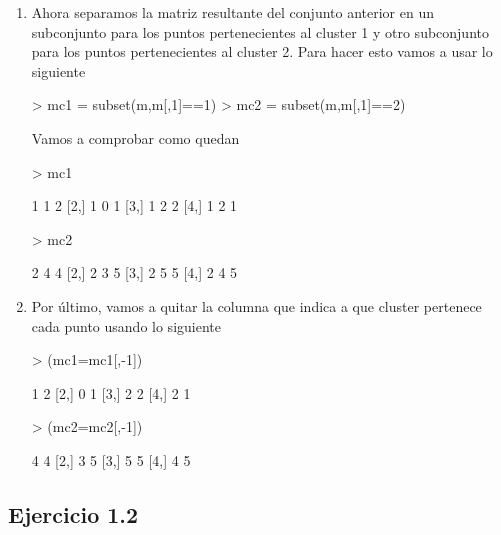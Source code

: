 \documentclass[parskip=full]{scrartcl}
\begin{document}
\begin{enumerate}
    \item Ahora separamos la matriz resultante del conjunto anterior en un subconjunto para los puntos pertenecientes al cluster 1 y otro subconjunto para los puntos pertenecientes al cluster 2. Para hacer esto vamos a usar lo siguiente


\begin{Schunk}
\begin{Sinput}
> mc1 = subset(m,m[,1]==1)
> mc2 = subset(m,m[,1]==2)
\end{Sinput}
\end{Schunk}


    Vamos a comprobar como quedan


\begin{Schunk}
\begin{Sinput}
> mc1
\end{Sinput}
\begin{Soutput}
     [,1] [,2] [,3]
[1,]    1    1    2
[2,]    1    0    1
[3,]    1    2    2
[4,]    1    2    1
\end{Soutput}
\begin{Sinput}
> mc2
\end{Sinput}
\begin{Soutput}
     [,1] [,2] [,3]
[1,]    2    4    4
[2,]    2    3    5
[3,]    2    5    5
[4,]    2    4    5
\end{Soutput}
\end{Schunk}


    \item Por último, vamos a quitar la columna que indica a que cluster pertenece cada punto usando lo siguiente


\begin{Schunk}
\begin{Sinput}
> (mc1=mc1[,-1])
\end{Sinput}
\begin{Soutput}
     [,1] [,2]
[1,]    1    2
[2,]    0    1
[3,]    2    2
[4,]    2    1
\end{Soutput}
\begin{Sinput}
> (mc2=mc2[,-1])
\end{Sinput}
\begin{Soutput}
     [,1] [,2]
[1,]    4    4
[2,]    3    5
[3,]    5    5
[4,]    4    5
\end{Soutput}
\end{Schunk}


\end{enumerate}

\subsection{Ejercicio 1.2}
\end{document}
